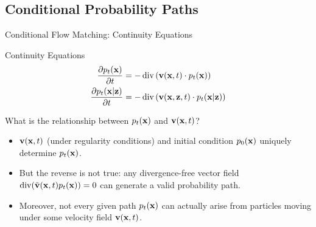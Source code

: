 \documentclass{beamer}
\renewcommand{\eqpause}{}
\begin{document}
\subsection{Conditional Probability Paths}
\begin{frame}{Conditional Flow Matching: Continuity Equations}
	\begin{block}{Continuity Equations}
		\vspace{-0.5cm}
		\begin{align*}
			\frac{\partial p_t(\mathbf{x})}{\partial t} &= - \operatorname{div}\left(\mathbf{v}(\mathbf{x}, t) \cdot p_t(\mathbf{x})\right) \\
			\frac{\partial p_t(\mathbf{x} | \mathbf{z})}{\partial t} &= - \operatorname{div}\left(\mathbf{v}(\mathbf{x}, \mathbf{z}, t) \cdot p_t(\mathbf{x} | \mathbf{z})\right)
		\end{align*}
		\vspace{-0.5cm}
	\end{block}
	What is the relationship between $p_t(\mathbf{x})$ and $\mathbf{v}(\mathbf{x}, t)$?
	\eqpause
	\begin{itemize}
		\item $\mathbf{v}(\mathbf{x}, t)$ (under regularity conditions) and initial condition $p_0(\mathbf{x})$ uniquely determine $p_t(\mathbf{x})$.
		\eqpause
		\item But the reverse is not true: any divergence-free vector field $\operatorname{div}(\tilde{\mathbf{v}}(\mathbf{x}, t)p_t(\mathbf{x})) = 0$ can generate a valid probability path.
		\eqpause
		\item Moreover, not  every given path $p_t(\mathbf{x})$ can actually arise from particles moving under
		some velocity field $\mathbf{v}(\mathbf{x}, t)$.
	\end{itemize}
\end{frame}
\end{document}

